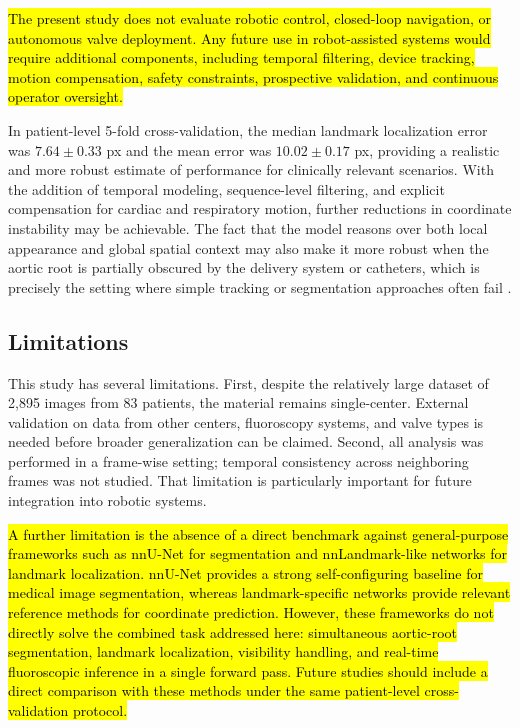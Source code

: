 \documentclass[utf8]{FrontiersinHarvard}
\begin{document}
\hl{The present study does not evaluate robotic control, closed-loop navigation, or autonomous valve deployment. Any future use in robot-assisted
systems would require additional components, including temporal filtering, device tracking, motion compensation, safety constraints, 
prospective validation, and continuous operator oversight.}

In patient-level 5-fold cross-validation, the median landmark localization error was $7.64 \pm 0.33$ px and the mean error 
was $10.02 \pm 0.17$ px, providing a realistic and more robust estimate of performance for clinically relevant scenarios. 
With the addition of temporal modeling, sequence-level filtering, and explicit compensation for cardiac and respiratory motion, 
further reductions in coordinate instability may be achievable. The fact that the model reasons over both local appearance and 
global spatial context may also make it more robust when the aortic root is partially obscured by the delivery system or catheters, 
which is precisely the setting where simple tracking or segmentation approaches often fail \citep{smits2025_autonomous,clinicaltrials_nct07152574}.

\subsection{Limitations}

This study has several limitations. First, despite the relatively large dataset of 2,895 images from 83 patients, the material 
remains single-center. External validation on data from other centers, fluoroscopy systems, and valve types is needed before 
broader generalization can be claimed. Second, all analysis was performed in a frame-wise setting; temporal consistency across 
neighboring frames was not studied. That limitation is particularly important for future integration into robotic systems.

\hl{A further limitation is the absence of a direct benchmark against general-purpose frameworks such as nnU-Net for segmentation and 
nnLandmark-like networks for landmark localization. nnU-Net provides a strong self-configuring baseline for medical image segmentation, 
whereas landmark-specific networks provide relevant reference methods for coordinate prediction. However, these frameworks do not directly 
solve the combined task addressed here: simultaneous aortic-root segmentation, landmark localization, visibility handling, and real-time 
fluoroscopic inference in a single forward pass. Future studies should include a direct comparison with these methods under the same 
patient-level cross-validation protocol.}
\end{document}

